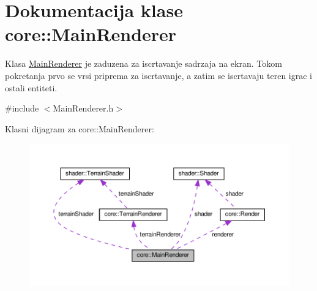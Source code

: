\hypertarget{classcore_1_1MainRenderer}{}\section{Dokumentacija klase core\+:\+:Main\+Renderer}
\label{classcore_1_1MainRenderer}


Klasa \hyperlink{classcore_1_1MainRenderer}{Main\+Renderer} je zaduzena za iscrtavanje sadrzaja na ekran. Tokom pokretanja prvo se vrsi priprema za iscrtavanje, a zatim se iscrtavaju teren igrac i ostali entiteti.  




{\ttfamily \#include $<$Main\+Renderer.\+h$>$}



Klasni dijagram za core\+:\+:Main\+Renderer\+:
\nopagebreak
\begin{figure}[H]
\begin{center}
\leavevmode
\includegraphics[width=350pt]{classcore_1_1MainRenderer__coll__graph}
\end{center}
\end{figure}
